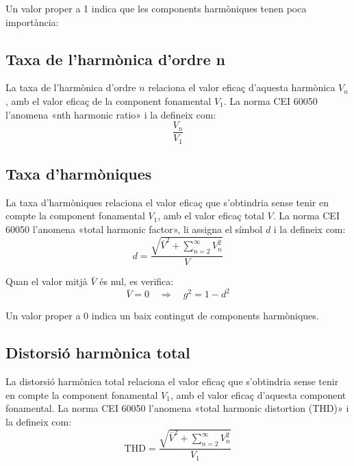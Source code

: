 Un valor proper a 1 indica  que les components harmòniques tenen poca importància:

\subsection{Taxa de l'harmònica d'ordre n}

La taxa de l'harmònica d'ordre $n$  relaciona el valor eficaç d'aquesta harmònica  $V_n$, amb el valor eficaç de la component fonamental
 $V_1$. La norma CEI 60050 l'anomena «nth harmonic ratio» i la defineix com:
\begin{equation}
    \frac{V_n}{V_1}
\end{equation}


\subsection{Taxa d'harmòniques}
 

La taxa d'harmòniques relaciona el valor eficaç  que
s'obtindria sense tenir en compte  la component fonamental $V_1$, amb el valor
eficaç total $V$. La norma CEI 60050 l'anomena «total harmonic factor», li assigna el símbol $d$ i la defineix com:
\begin{equation}
    d = \frac{\sqrt{\bar{V}^2+\displaystyle\sum_{n=2}^\infty V^2_n}}{V}
\end{equation}

Quan el valor mitjà $\bar{V}$ és nul, es verifica:
\begin{equation}
    \bar{V}=0 \quad \Rightarrow\quad g^2 = 1 - d^2
\end{equation}

Un valor proper a 0 indica un baix contingut de components harmòniques.

\subsection{Distorsió harmònica total} 

 La distorsió harmònica total  relaciona el valor eficaç  que
s'obtindria sense tenir en compte  la component fonamental $V_1$,
amb el valor eficaç d'aquesta component fonamental. La norma CEI 60050 l'anomena «total harmonic distortion (THD)» i la defineix com:
\begin{equation}
    \text{THD} = \frac{\sqrt{\bar{V}^2+  \displaystyle\sum_{n=2}^\infty V^2_n}} {V_1}
\end{equation}

